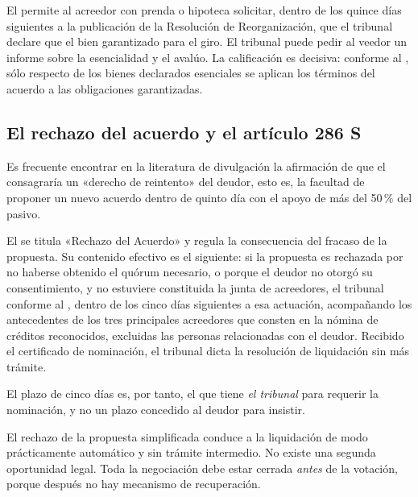 El  permite al acreedor con prenda o hipoteca solicitar, dentro de los quince
días siguientes a la publicación de la Resolución de Reorganización, que el tribunal declare
que el bien garantizado  para el giro. El tribunal puede pedir al
veedor un informe sobre la esencialidad y el avalúo. La calificación es decisiva: conforme
al , sólo respecto de los bienes declarados esenciales se aplican los términos
del acuerdo a las obligaciones garantizadas.

\subsection{El rechazo del acuerdo y el artículo 286 S}

\begin{alerta}
Es frecuente encontrar en la literatura de divulgación la afirmación de que el
 consagraría un «derecho de reintento» del deudor, esto es, la facultad de
proponer un nuevo acuerdo dentro de quinto día con el apoyo de más del 50\,\% del pasivo.
\end{alerta}

El  se titula «Rechazo del Acuerdo» y regula la consecuencia del fracaso de la
propuesta. Su contenido efectivo es el siguiente: si la propuesta es rechazada por no
haberse obtenido el quórum necesario, o porque el deudor no otorgó su consentimiento, y
no estuviere constituida la junta de acreedores, el tribunal  conforme al , dentro de los cinco
días siguientes a esa actuación, acompañando los antecedentes de los tres principales
acreedores que consten en la nómina de créditos reconocidos, excluidas las personas
relacionadas con el deudor. Recibido el certificado de nominación, el tribunal dicta la
resolución de liquidación sin más trámite.

El plazo de cinco días es, por tanto, el que tiene \emph{el tribunal} para requerir la
nominación, y no un plazo concedido al deudor para insistir.

\begin{foco}
El rechazo de la propuesta simplificada conduce a la liquidación de modo prácticamente
automático y sin trámite intermedio. No existe una segunda oportunidad legal. Toda la
negociación debe estar cerrada \emph{antes} de la votación, porque después no hay
mecanismo de recuperación.
\end{foco}

